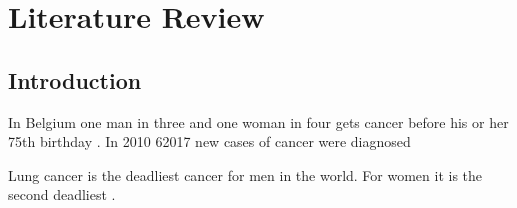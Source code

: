 \section{Literature Review}
\subsection{Introduction}
In Belgium one man in three and one woman in four gets cancer before his or
her 75th birthday \cite{kanker}. In 2010 62017 new cases of cancer were
diagnosed \cite{kankerliga}

Lung cancer is the deadliest cancer for men in the world.
For women it is the second deadliest \cite{zheng}. 

